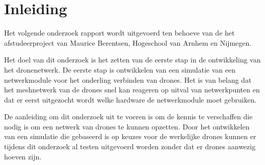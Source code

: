 \documentclass[a4paper, 11pt, oneside]{report}
\begin{document}
\tableofcontents
\clearpage








\chapter{Inleiding}
\label{chapter:inleiding}


Het volgende onderzoek rapport wordt uitgevoerd ten behoeve van de het afstudeerproject van Maurice Berentsen, Hogeschool van Arnhem en Nijmegen.

Het doel van dit onderzoek is het zetten van de eerste stap in de ontwikkeling van het dronenetwerk.
De eerste stap is ontwikkelen van een simulatie van een netwerkmodule voor het onderling verbinden van drones.
Het is van belang dat het meshnetwerk van de drones snel kan reageren op uitval van netwerkpunten en dat er eerst uitgezocht wordt welke hardware de netwerkmodule moet gebruiken.

De aanleiding om dit onderzoek uit te voeren is om de kennis te verschaffen die nodig is om een netwerk van drones te kunnen opzetten.
Door het ontwikkelen van een simulatie die gebaseerd is op keuzes voor de werkelijke drones kunnen er tijdens dit onderzoek al testen uitgevoerd worden zonder dat er drones aanwezig hoeven zijn. 
\end{document}
